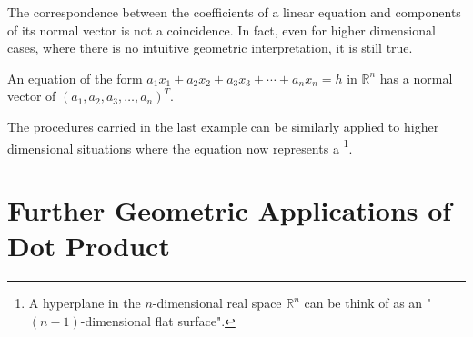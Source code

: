 The correspondence between the coefficients of a linear equation and components of its normal vector is not a coincidence. In fact, even for higher dimensional cases, where there is no intuitive geometric interpretation, it is still true.
\begin{proper}
\label{proper:normalhyperplane}
An equation of the form $a_1x_1 + a_2x_2 + a_3x_3 + \cdots + a_nx_n = h$ in $\mathbb{R}^n$ has a normal vector of $(a_1, a_2, a_3, \ldots, a_n)^T$.
\end{proper}
The procedures carried in the last example can be similarly applied to higher dimensional situations where the equation now represents a \footnote{A hyperplane in the $n$-dimensional real space $\mathbb{R}^n$ can be think of as an "$(n-1)$-dimensional flat surface".}.

\section{Further Geometric Applications of Dot Product}
